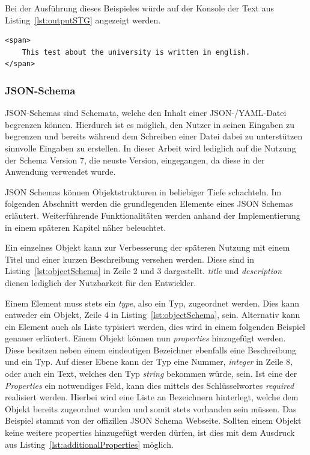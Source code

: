 

Bei der Ausführung dieses Beispieles würde auf der Konsole der Text aus Listing~\ref{lst:outputSTG} angezeigt werden.

\begin{lstlisting}[label={lst:outputSTG}]
<span>
    This test about the university is written in english.
</span>
\end{lstlisting}

\subsubsection{JSON-Schema}\label{subsubsec:json-schema}
JSON-Schemas sind Schemata, welche den Inhalt einer JSON-/YAML-Datei begrenzen können.
Hierdurch ist es möglich, den Nutzer in seinen Eingaben zu begrenzen und bereits während dem Schreiben einer Datei dabei zu unterstützen sinnvolle Eingaben zu erstellen.
In dieser Arbeit wird lediglich auf die Nutzung der Schema Version 7, die neuste Version, eingegangen, da diese in der Anwendung verwendet wurde.

JSON Schemas können Objektstrukturen in beliebiger Tiefe schachteln.
Im folgenden Abschnitt werden die grundlegenden Elemente eines JSON Schemas erläutert.
Weiterführende Funktionalitäten werden anhand der Implementierung in einem späteren Kapitel näher beleuchtet.

Ein einzelnes Objekt kann zur Verbesserung der späteren Nutzung mit einem Titel und einer kurzen Beschreibung versehen werden.
Diese sind in Listing~\ref{lst:objectSchema} in Zeile 2 und 3 dargestellt.
\textit{title} und \textit{description} dienen lediglich der Nutzbarkeit für den Entwickler.



Einem Element muss stets ein \textit{type}, also ein Typ, zugeordnet werden.
Dies kann entweder ein Objekt, Zeile 4 in Listing~\ref{lst:objectSchema}, sein.
Alternativ kann ein Element auch als Liste typisiert werden, dies wird in einem folgenden Beispiel genauer erläutert.
Einem Objekt können nun \textit{properties} hinzugefügt werden.
Diese besitzen neben einem eindeutigen Bezeichner ebenfalls eine Beschreibung und ein Typ.
Auf dieser Ebene kann der Typ eine Nummer, \textit{integer} in Zeile 8, oder auch ein Text, welches den Typ \textit{string} bekommen würde, sein.
Ist eine der \textit{Properties} ein notwendiges Feld, kann dies mittels des Schlüsselwortes \textit{required} realisiert werden.
Hierbei wird eine Liste an Bezeichnern hinterlegt, welche dem Objekt bereits zugeordnet wurden und somit stets vorhanden sein müssen.
Das Beispiel stammt von der offizillen JSON Schema Webseite.\cite*{schemaExample}
Sollten einem Objekt keine weitere properties hinzugefügt werden dürfen, ist dies mit dem Ausdruck aus Listing~\ref{lst:additionalProperties} möglich.

